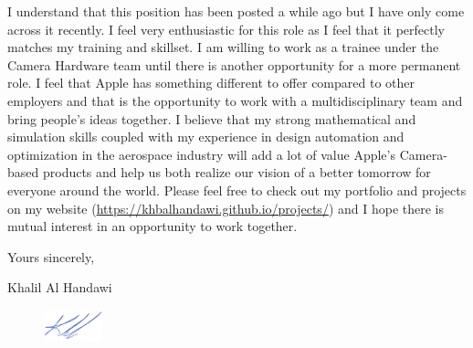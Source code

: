 \documentclass[12pt]{article} %
\begin{document}
I understand that this position has been posted a while ago but I have only come across it recently. I feel very enthusiastic for this role as I feel that it perfectly matches my training and skillset. I am willing to work as a trainee under the Camera Hardware team until there is another opportunity for a more permanent role. I feel that Apple has something different to offer compared to other employers and that is the opportunity to work with a multidisciplinary team and bring people's ideas together. I believe that my strong mathematical and simulation skills coupled with my experience in design automation and optimization in the aerospace industry will add a lot of value Apple's Camera-based products and help us both realize our vision of a better tomorrow for everyone around the world. Please feel free to check out my portfolio and projects on my website (\href{https://khbalhandawi.github.io/projects/}{https://khbalhandawi.github.io/projects/}) and I hope there is mutual interest in an opportunity to work together.

\medskip %

Yours sincerely,

\medskip %

Khalil Al Handawi

\begin{figure}[h]
	\includegraphics[width=0.15\textwidth]{Signiture.png}
\end{figure}

\medskip %

\end{document}
